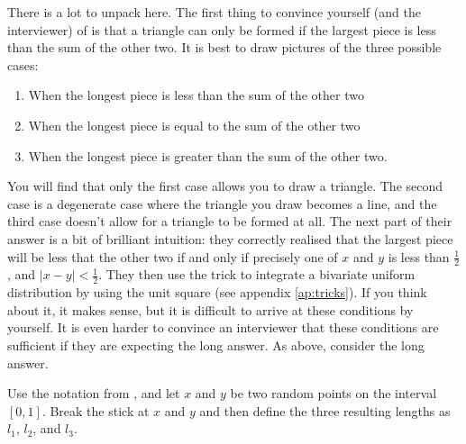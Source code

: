 \documentclass[a4paper]{article}
\begin{document}
There is a lot to unpack here.
The first thing to convince yourself (and the interviewer) of is that a triangle can only be formed if the largest piece is less than the sum of the other two.
It is best to draw pictures of the three possible cases:
\begin{enumerate}
  \item When the longest piece is less than the sum of the other two
  \item When the longest piece is equal to the sum of the other two
  \item When the longest piece is greater than the sum of the other two.
\end{enumerate}
You will find that only the first case allows you to draw a triangle.
The second case is a degenerate case where the triangle you draw becomes a line, and the third case doesn't allow for a triangle to be formed at all.
The next part of their answer is a bit of brilliant intuition:
they correctly realised that the largest piece will be less that the other two if and only if precisely one of $x$ and $y$ is less than $\frac{1}{2}$, and $|x-y|<\frac{1}{2}$.
They then use the trick to integrate a bivariate uniform distribution by using the unit square (see appendix \ref{ap:tricks}).
If you think about it, it makes sense, but it is difficult to arrive at these conditions by yourself.
It is even harder to convince an interviewer that these conditions are sufficient if they are expecting the long answer.
As above, consider the long answer.

Use the notation from \citet{JoshiQA}, and let $x$ and $y$ be two random points on the interval $[0,1]$.
Break the stick at $x$ and $y$ and then define the three resulting lengths as
$l_1$,
$l_2$, and
$l_3$.
\end{document}
